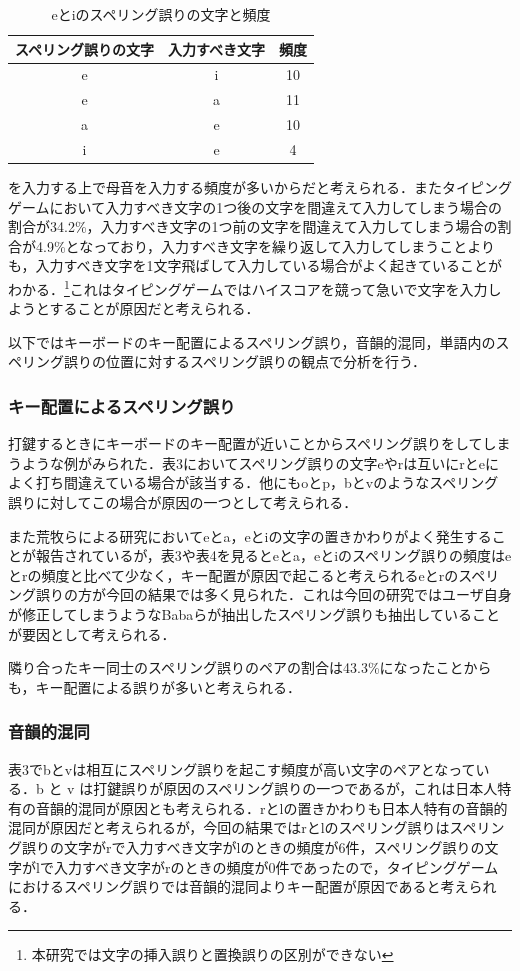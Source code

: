 \documentclass{jarticle}
\begin{document}
 \begin{table}[t]
  \small
  \centering
   \caption{eとiのスペリング誤りの文字と頻度}
   \begin{tabular}{|c|c|c|} \hline
       	スペリング誤りの文字 & 入力すべき文字 & 頻度\\ \hline
	    e & i & 10\\ \hline
	    e & a & 11\\ \hline
	    a & e & 10\\ \hline
	    i & e & 4\\ \hline
   \end{tabular}
 \end{table}

を入力する上で母音を入力する頻度が多いからだと考えられる．またタイピングゲームにおいて入力すべき文字の1つ後の文字を間違えて入力してしまう場合の割合が34.2\%，入力すべき文字の1つ前の文字を間違えて入力してしまう場合の割合が4.9\%となっており，入力すべき文字を繰り返して入力してしまうことよりも，入力すべき文字を1文字飛ばして入力している場合がよく起きていることがわかる．\footnote{本研究では文字の挿入誤りと置換誤りの区別ができない}これはタイピングゲームではハイスコアを競って急いで文字を入力しようとすることが原因だと考えられる．

以下ではキーボードのキー配置によるスペリング誤り，音韻的混同，単語内のスペリング誤りの位置に対するスペリング誤りの観点で分析を行う．

\subsubsection{キー配置によるスペリング誤り}
打鍵するときにキーボードのキー配置が近いことからスペリング誤りをしてしまうような例がみられた．表3においてスペリング誤りの文字eやrは互いにrとeによく打ち間違えている場合が該当する．他にもoとp，bとvのようなスペリング誤りに対してこの場合が原因の一つとして考えられる．

また荒牧らによる研究\cite{aramakiNLP2010}においてeとa，eとiの文字の置きかわりがよく発生することが報告されているが，表3や表4を見るとeとa，eとiのスペリング誤りの頻度はeとrの頻度と比べて少なく，キー配置が原因で起こると考えられるeとrのスペリング誤りの方が今回の結果では多く見られた．これは今回の研究ではユーザ自身が修正してしまうようなBabaらが抽出したスペリング誤り\cite{babaACL2012}も抽出していることが要因として考えられる．

隣り合ったキー同士のスペリング誤りのペアの割合は43.3\%になったことからも，キー配置による誤りが多いと考えられる．

\subsubsection{音韻的混同}
表3でbとvは相互にスペリング誤りを起こす頻度が高い文字のペアとなっている．b と v は打鍵誤りが原因のスペリング誤りの一つであるが，これは日本人特有の音韻的混同が原因とも考えられる．rとlの置きかわりも日本人特有の音韻的混同が原因だと考えられるが，今回の結果ではrとlのスペリング誤りはスペリング誤りの文字がrで入力すべき文字がlのときの頻度が6件，スペリング誤りの文字がlで入力すべき文字がrのときの頻度が0件であったので，タイピングゲームにおけるスペリング誤りでは音韻的混同よりキー配置が原因であると考えられる．
\end{document}
